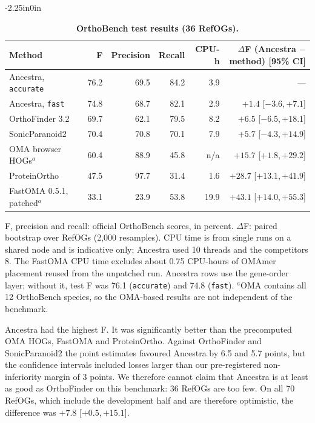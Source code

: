 \documentclass[10pt,letterpaper]{article}
\newcommand{\CI}[2]{[#1,\,#2]}
\begin{document}
\begin{table}[!ht]
\begin{adjustwidth}{-2.25in}{0in}
\centering
\caption{{\bf OrthoBench test results (36 RefOGs).}}
\begin{tabular}{lrrrrr}
\hline
Method & F & Precision & Recall & CPU-h & $\Delta$F (Ancestra $-$ method) [95\% CI]\\
\hline
Ancestra, \texttt{accurate} & 76.2 & 69.5 & 84.2 & 3.9 & --- \\
Ancestra, \texttt{fast} & 74.8 & 68.7 & 82.1 & 2.9 & $+1.4$ \CI{$-3.6$}{$+7.1$}\\
OrthoFinder 3.2 & 69.7 & 62.1 & 79.5 & 8.2 & $+6.5$ \CI{$-6.5$}{$+18.1$}\\
SonicParanoid2 & 70.4 & 70.8 & 70.1 & 7.9 & $+5.7$ \CI{$-4.3$}{$+14.9$}\\
OMA browser HOGs$^a$ & 60.4 & 88.9 & 45.8 & n/a & $+15.7$ \CI{$+1.8$}{$+29.2$}\\
ProteinOrtho & 47.5 & 97.7 & 31.4 & 1.6 & $+28.7$ \CI{$+13.1$}{$+41.9$}\\
FastOMA 0.5.1, patched$^a$ & 33.1 & 23.9 & 53.8 & 19.9 & $+43.1$ \CI{$+14.0$}{$+55.3$}\\
\hline
\end{tabular}
\begin{flushleft}F, precision and recall: official OrthoBench scores, in percent. $\Delta$F: paired bootstrap over RefOGs (2,000 resamples). CPU time is from single runs on a shared node and is indicative only; Ancestra used 10 threads and the competitors 8. The FastOMA CPU time excludes about 0.75 CPU-hours of OMAmer placement reused from the unpatched run. Ancestra rows use the gene-order layer; without it, test F was 76.1 (\texttt{accurate}) and 74.8 (\texttt{fast}). $^a$OMA contains all 12 OrthoBench species, so the OMA-based results are not independent of the benchmark.
\end{flushleft}
\label{tab:ob}
\end{adjustwidth}
\end{table}

Ancestra had the highest F. It was significantly better than the precomputed OMA HOGs, FastOMA and ProteinOrtho. Against OrthoFinder and SonicParanoid2 the point estimates favoured Ancestra by 6.5 and 5.7 points, but the confidence intervals included losses larger than our pre-registered non-inferiority margin of 3 points. We therefore cannot claim that Ancestra is at least as good as OrthoFinder on this benchmark: 36 RefOGs are too few. On all 70 RefOGs, which include the development half and are therefore optimistic, the difference was $+7.8$ \CI{$+0.5$}{$+15.1$}.
\end{document}
